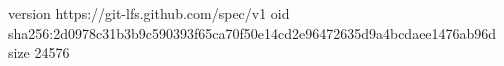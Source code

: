 version https://git-lfs.github.com/spec/v1
oid sha256:2d0978c31b3b9c590393f65ca70f50e14cd2e96472635d9a4bcdaee1476ab96d
size 24576
